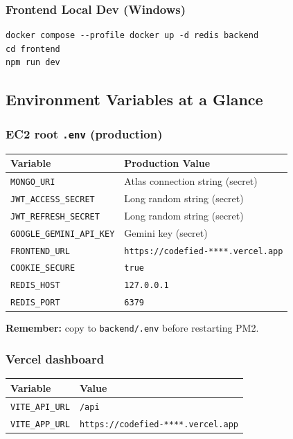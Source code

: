 \documentclass[11pt,a4paper]{article}
\newcommand{\maskedvercelurl}{\texttt{https://codefied-****.vercel.app}}
\begin{document}
\subsubsection{Frontend Local Dev (Windows)}
\begin{lstlisting}[style=terminal]
docker compose --profile docker up -d redis backend
cd frontend
npm run dev
\end{lstlisting}

\subsection{Environment Variables at a Glance}

\subsubsection{EC2 root \texttt{.env} (production)}
\begin{table}[h]
\centering
\small
\begin{tabular}{@{}ll@{}}
\toprule
\textbf{Variable} & \textbf{Production Value} \\
\midrule
\texttt{MONGO\_URI}           & Atlas connection string (secret) \\
\texttt{JWT\_ACCESS\_SECRET}  & Long random string (secret) \\
\texttt{JWT\_REFRESH\_SECRET}  & Long random string (secret) \\
\texttt{GOOGLE\_GEMINI\_API\_KEY} & Gemini key (secret) \\
\texttt{FRONTEND\_URL}        & \maskedvercelurl \\
\texttt{COOKIE\_SECURE}       & \texttt{true} \\
\texttt{REDIS\_HOST}          & \texttt{127.0.0.1} \\
\texttt{REDIS\_PORT}          & \texttt{6379} \\
\bottomrule
\end{tabular}
\end{table}

\textbf{Remember:} copy to \texttt{backend/.env} before restarting PM2.

\subsubsection{Vercel dashboard}
\begin{table}[h]
\centering
\small
\begin{tabular}{@{}ll@{}}
\toprule
\textbf{Variable} & \textbf{Value} \\
\midrule
\texttt{VITE\_API\_URL} & \texttt{/api} \\
\texttt{VITE\_APP\_URL} & \maskedvercelurl \\
\bottomrule
\end{tabular}
\end{table}
\end{document}
